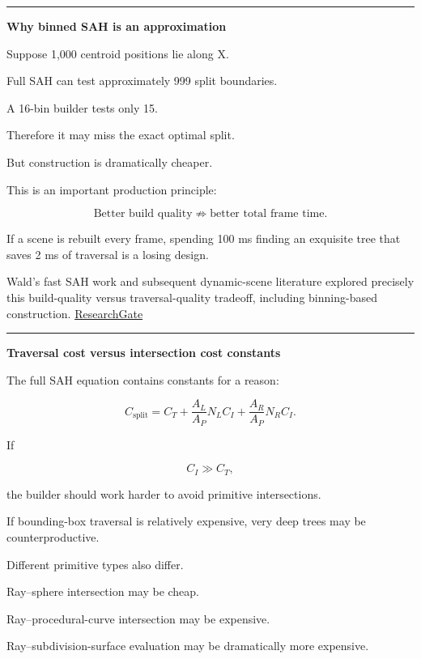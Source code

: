 \begin{center}\rule{0.5\linewidth}{0.5pt}\end{center}

\textbf{Why binned SAH is an approximation}

Suppose 1,000 centroid positions lie along X.

Full SAH can test approximately 999 split boundaries.

A 16-bin builder tests only 15.

Therefore it may miss the exact optimal split.

But construction is dramatically cheaper.

This is an important production principle:

\[
\text{Better build quality}
\not\Rightarrow
\text{better total frame time}.
\]

If a scene is rebuilt every frame, spending 100 ms finding an exquisite tree that saves 2 ms of traversal is a losing design.

Wald's fast SAH work and subsequent dynamic-scene literature explored precisely this build-quality versus traversal-quality tradeoff, including binning-based construction. \href{https://www.researchgate.net/publication/4278645_On_Fast_Construction_of_SAH_based_Bounding_Volume_Hierarchies?utm_source=chatgpt.com}{ResearchGate}

\begin{center}\rule{0.5\linewidth}{0.5pt}\end{center}

\textbf{Traversal cost versus intersection cost constants}

The full SAH equation contains constants for a reason:

\[
C_{\text{split}}
=
C_T+
\frac{A_L}{A_P}N_LC_I+
\frac{A_R}{A_P}N_RC_I.
\]

If

\[
C_I\gg C_T,
\]

the builder should work harder to avoid primitive intersections.

If bounding-box traversal is relatively expensive, very deep trees may be counterproductive.

Different primitive types also differ.

Ray--sphere intersection may be cheap.

Ray--procedural-curve intersection may be expensive.

Ray--subdivision-surface evaluation may be dramatically more expensive.

